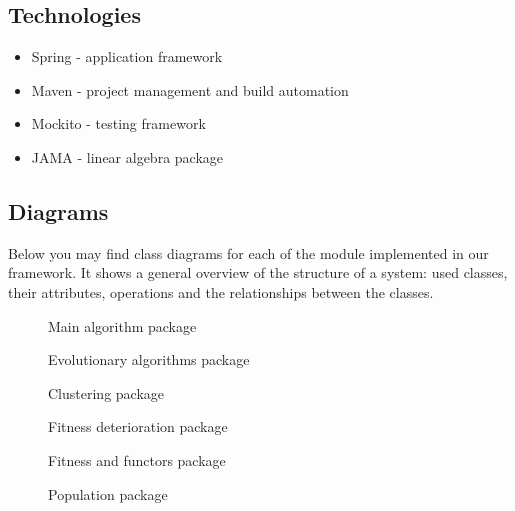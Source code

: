 \subsection{Technologies}
\begin{itemize}
  \item Spring \cite{spring} - application framework
  \item Maven \cite{maven} - project management and build automation
  \item Mockito \cite{mockito} - testing framework 
  \item JAMA \cite{jama} - linear algebra package
\end{itemize}

\subsection{Diagrams}

Below you may find class diagrams for each of the module implemented in our
framework. It shows a general overview of the structure of a system: used
classes, their attributes, operations and the relationships between the classes.


\begin{figure}
  \centering
  \caption{Main algorithm package}
  \label{alg}
\end{figure}

\begin{figure}
  \centering
  \caption{Evolutionary algorithms package}
  \label{ea}
\end{figure}

\begin{figure}
  \centering
  \caption{Clustering package}
  \label{optics}
\end{figure}

\begin{figure}
  \centering
  \caption{Fitness deterioration package}
  \label{fitdet}
\end{figure}

\begin{figure}
  \centering
  \caption{Fitness and functors package}
  \label{ea}
\end{figure}

\begin{figure}
  \centering
  \caption{Population package}
  \label{ea}
\end{figure}